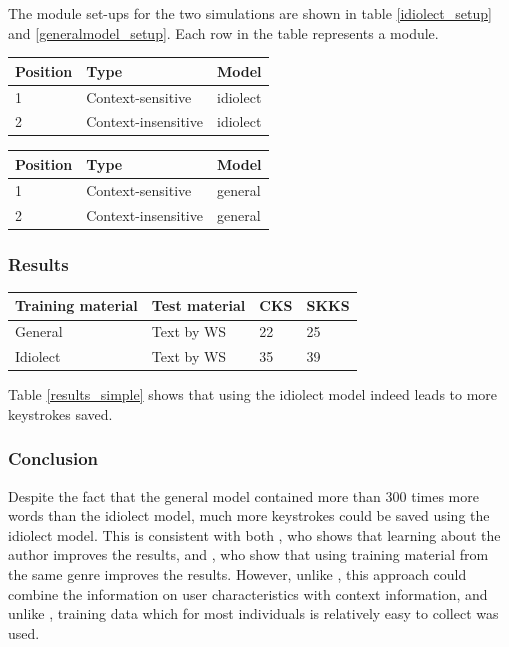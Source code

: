 \documentclass[12pt]{article}
\let\originaltable\table
\let\endoriginaltable\endtable
\renewenvironment{table}[1][ht]{%
  \originaltable[#1]
  \centering}%
  {\endoriginaltable}
\begin{document}
The module set-ups for the two simulations are shown in table \ref{idiolect_setup} and \ref{generalmodel_setup}. Each row in the table represents a module.

\begin{table}[H]
\begin{tabular}{lll} 
Position&Type&Model\\
\hline
1&Context-sensitive&idiolect\\
2&Context-insensitive&idiolect\\
\end{tabular} 
\caption{Module order for a simple idiolect simulation.} \label{idiolect_setup}  
\end{table}

\begin{table}[H]
\begin{tabular}{lll} 
Position&Type&Model\\
\hline
1&Context-sensitive&general\\
2&Context-insensitive&general\\
\end{tabular} 
\caption{Module order for a simulation for the general model.} \label{generalmodel_setup} 
\end{table}


\subsubsection{Results}

\begin{table}[H]
\begin{tabular}{ll|ll} 
Training material&Test material&CKS&SKKS\\
\hline
General &Text by WS&22&25\\
Idiolect&Text by WS&35&39\\
\end{tabular} 
\caption{Percentage of keystrokes that can be saved when using the general and the idiolect model} \label{results_simple}
\end{table}

Table \ref{results_simple} shows that  using the idiolect model indeed leads to more keystrokes saved. 

\subsubsection{Conclusion}
Despite the fact that the general model contained more than 300 times more words than the idiolect model, much more keystrokes could be saved using the idiolect model. This is consistent with both , who shows that learning about the author improves the results, and , who show that using training material from the same genre improves the results. However, unlike , this approach could combine the information on user characteristics with context information, and unlike , training data which for most individuals is relatively easy to collect was used.
\end{document}
